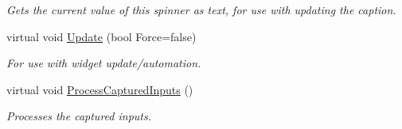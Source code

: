 \begin{DoxyCompactItemize}
\begin{DoxyCompactList}\small\item\em Gets the current value of this spinner as text, for use with updating the caption. \item\end{DoxyCompactList}\item 
\hypertarget{classphys_1_1UI_1_1Spinner_a9f19c47509ab45d47807d25b919f8af2}{
virtual void \hyperlink{classphys_1_1UI_1_1Spinner_a9f19c47509ab45d47807d25b919f8af2}{Update} (bool Force=false)}
\label{d7/d81/classphys_1_1UI_1_1Spinner_a9f19c47509ab45d47807d25b919f8af2}

\begin{DoxyCompactList}\small\item\em For use with widget update/automation. \item\end{DoxyCompactList}\item 
\hypertarget{classphys_1_1UI_1_1Spinner_acefea149af0d9e9afa06cd5f5559a546}{
virtual void \hyperlink{classphys_1_1UI_1_1Spinner_acefea149af0d9e9afa06cd5f5559a546}{ProcessCapturedInputs} ()}
\label{d7/d81/classphys_1_1UI_1_1Spinner_acefea149af0d9e9afa06cd5f5559a546}

\begin{DoxyCompactList}\small\item\em Processes the captured inputs. \item\end{DoxyCompactList}\end{DoxyCompactItemize}
